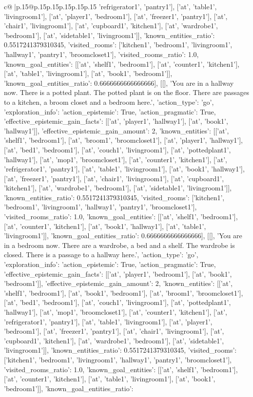 \documentclass{article}
\begin{document}
{\begin{supertabular}{c@{$\;$}|p{.15\linewidth}@{}p{.15\linewidth}p{.15\linewidth}p{.15\linewidth}p{.15\linewidth}p{.15\linewidth}}
{{{'refrigerator1', 'pantry1'], ['at', 'table1', 'livingroom1'], ['at', 'player1', 'bedroom1'], ['at', 'freezer1', 'pantry1'], ['at', 'chair1', 'livingroom1'], ['at', 'cupboard1', 'kitchen1'], ['at', 'wardrobe1', 'bedroom1'], ['at', 'sidetable1', 'livingroom1']], 'known_entities_ratio': 0.5517241379310345, 'visited_rooms': ['kitchen1', 'bedroom1', 'livingroom1', 'hallway1', 'pantry1', 'broomcloset1'], 'visited_rooms_ratio': 1.0, 'known_goal_entities': [['at', 'shelf1', 'bedroom1'], ['at', 'counter1', 'kitchen1'], ['at', 'table1', 'livingroom1'], ['at', 'book1', 'bedroom1']], 'known_goal_entities_ratio': 0.6666666666666666}}], [[], 'You are in a hallway now. There is a potted plant. The potted plant is on the floor. There are passages to a kitchen, a broom closet and a bedroom here.', {'action_type': 'go', 'exploration_info': {'action_epistemic': True, 'action_pragmatic': True, 'effective_epistemic_gain_facts': [['at', 'player1', 'hallway1'], ['at', 'book1', 'hallway1']], 'effective_epistemic_gain_amount': 2, 'known_entities': [['at', 'shelf1', 'bedroom1'], ['at', 'broom1', 'broomcloset1'], ['at', 'player1', 'hallway1'], ['at', 'bed1', 'bedroom1'], ['at', 'couch1', 'livingroom1'], ['at', 'pottedplant1', 'hallway1'], ['at', 'mop1', 'broomcloset1'], ['at', 'counter1', 'kitchen1'], ['at', 'refrigerator1', 'pantry1'], ['at', 'table1', 'livingroom1'], ['at', 'book1', 'hallway1'], ['at', 'freezer1', 'pantry1'], ['at', 'chair1', 'livingroom1'], ['at', 'cupboard1', 'kitchen1'], ['at', 'wardrobe1', 'bedroom1'], ['at', 'sidetable1', 'livingroom1']], 'known_entities_ratio': 0.5517241379310345, 'visited_rooms': ['kitchen1', 'bedroom1', 'livingroom1', 'hallway1', 'pantry1', 'broomcloset1'], 'visited_rooms_ratio': 1.0, 'known_goal_entities': [['at', 'shelf1', 'bedroom1'], ['at', 'counter1', 'kitchen1'], ['at', 'book1', 'hallway1'], ['at', 'table1', 'livingroom1']], 'known_goal_entities_ratio': 0.6666666666666666}}], [[], 'You are in a bedroom now. There are a wardrobe, a bed and a shelf. The wardrobe is closed. There is a passage to a hallway here.', {'action_type': 'go', 'exploration_info': {'action_epistemic': True, 'action_pragmatic': True, 'effective_epistemic_gain_facts': [['at', 'player1', 'bedroom1'], ['at', 'book1', 'bedroom1']], 'effective_epistemic_gain_amount': 2, 'known_entities': [['at', 'shelf1', 'bedroom1'], ['at', 'book1', 'bedroom1'], ['at', 'broom1', 'broomcloset1'], ['at', 'bed1', 'bedroom1'], ['at', 'couch1', 'livingroom1'], ['at', 'pottedplant1', 'hallway1'], ['at', 'mop1', 'broomcloset1'], ['at', 'counter1', 'kitchen1'], ['at', 'refrigerator1', 'pantry1'], ['at', 'table1', 'livingroom1'], ['at', 'player1', 'bedroom1'], ['at', 'freezer1', 'pantry1'], ['at', 'chair1', 'livingroom1'], ['at', 'cupboard1', 'kitchen1'], ['at', 'wardrobe1', 'bedroom1'], ['at', 'sidetable1', 'livingroom1']], 'known_entities_ratio': 0.5517241379310345, 'visited_rooms': ['kitchen1', 'bedroom1', 'livingroom1', 'hallway1', 'pantry1', 'broomcloset1'], 'visited_rooms_ratio': 1.0, 'known_goal_entities': [['at', 'shelf1', 'bedroom1'], ['at', 'counter1', 'kitchen1'], ['at', 'table1', 'livingroom1'], ['at', 'book1', 'bedroom1']], 'known_goal_entities_ratio': }}}
\end{supertabular}}
\end{document}
